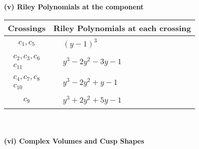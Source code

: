 \documentclass[1p]{elsarticle_modified}
\theoremstyle{definition}
\begin{document}
\flushleft \textbf{(v) Riley Polynomials at the component}\newline \\
\begin{tabular}{m{50pt}|m{274pt}}
Crossings & \hspace{64pt}Riley Polynomials at each crossing \\
\hline $$\begin{aligned}c_{1},c_{5}\end{aligned}$$&$\begin{aligned}
&(y-1)^3
\end{aligned}$\\
\hline $$\begin{aligned}c_{2},c_{3},c_{6}\\c_{11}\end{aligned}$$&$\begin{aligned}
&y^3-2 y^2-3 y-1
\end{aligned}$\\
\hline $$\begin{aligned}c_{4},c_{7},c_{8}\\c_{10}\end{aligned}$$&$\begin{aligned}
&y^3-2 y^2+y-1
\end{aligned}$\\
\hline $$\begin{aligned}c_{9}\end{aligned}$$&$\begin{aligned}
&y^3+2 y^2+5 y-1
\end{aligned}$\\
\hline
\end{tabular}\\~\\
\newpage\flushleft \textbf{(vi) Complex Volumes and Cusp Shapes}
\end{document}
